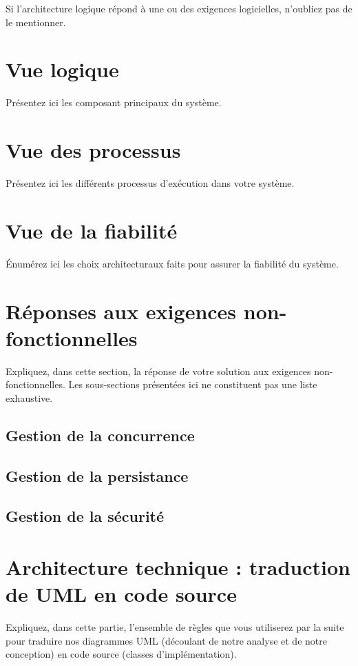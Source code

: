 Si l'architecture logique répond à une ou des exigences logicielles, n'oubliez pas de le mentionner.

\section{Vue logique}

Présentez ici les composant principaux du système.

\section{Vue des processus}
Présentez ici les différents processus d'exécution dans votre système.

\section{Vue de la fiabilité}

Énumérez ici les choix architecturaux faits pour assurer la fiabilité du système.


\section{Réponses aux exigences non-fonctionnelles}
Expliquez, dans cette section, la réponse de votre solution aux exigences non-fonctionnelles. 
Les sous-sections présentées ici ne constituent pas une liste exhaustive. 

\subsection{Gestion de la concurrence}

\subsection{Gestion de la persistance}

\subsection{Gestion de la sécurité}


\section{Architecture technique : traduction de UML en code source}
Expliquez, dans cette partie, l'ensemble de règles que vous utiliserez par la suite pour traduire nos diagrammes \textsc{UML} (découlant de notre analyse et de notre conception) en code source (classes d'implémentation).\\ 


